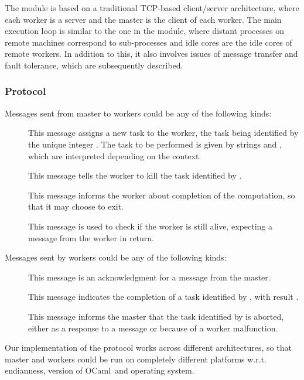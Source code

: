 \documentclass[a4paper,12pt]{article}
\newcommand{\Ocaml}{OCaml}
\begin{document}
The  module is based on a traditional TCP-based client/server
architecture, where each worker is a server and the master is the
client of each worker. The main execution loop is similar to the one
in the  module, where distant processes on remote machines
correspond to sub-processes and idle cores are the idle cores 
of remote workers. In addition to this, it also involves issues of message
transfer and fault tolerance, which are subsequently described.

\subsubsection{Protocol}\label{sec:protocol}

Messages sent from master to workers could be any of the following kinds:
\begin{description}
\item[] This message assigns a
  new task to the worker, the task being identified by the unique
  integer . The task to be performed is given by strings 
  and , which are interpreted depending on the context.

\item[] This message tells the worker to kill the task
  identified by .

\item[] This message informs the worker about completion of
  the computation, so that it may choose to exit.

\item[] This message is used to check if the worker is still
  alive, expecting a  message from the worker in return.
\end{description}
Messages sent by workers could be any of the following kinds:
\begin{description}
\item[] This message is an acknowledgment for a 
  message from the master.

\item[] This message indicates the
  completion of a task identified by , with result .

\item[] This message informs the master that the
  task identified by  is aborted, either as a response to a
   message or because of a worker malfunction.
\end{description}
Our implementation of the protocol works across different
architectures, so that master and workers could be run on completely
different platforms w.r.t. endianness, version of \Ocaml\ and
operating system.
\end{document}
